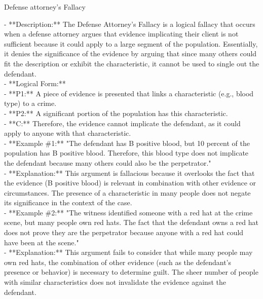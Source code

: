 \documentclass[a4paper,12pt,single,pdftex]{scrartcl}
\begin{document}
Defense attorney's Fallacy
    
      - **Description:** The Defense Attorney's Fallacy is a logical fallacy that occurs when a defense attorney argues that evidence implicating their client is not sufficient because it could apply to a large segment of the population. Essentially, it denies the significance of the evidence by arguing that since many others could fit the description or exhibit the characteristic, it cannot be used to single out the defendant.
    \\

    
      - **Logical Form:**
    \\

    
        - **P1:** A piece of evidence is presented that links a characteristic (e.g., blood type) to a crime.
    \\

    
        - **P2:** A significant portion of the population has this characteristic.
    \\

    
        - **C:** Therefore, the evidence cannot implicate the defendant, as it could apply to anyone with that characteristic.
    \\

    
      - **Example \#1:** "The defendant has B positive blood, but 10 percent of the population has B positive blood. Therefore, this blood type does not implicate the defendant because many others could also be the perpetrator."
    \\

    
      - **Explanation:** This argument is fallacious because it overlooks the fact that the evidence (B positive blood) is relevant in combination with other evidence or circumstances. The presence of a characteristic in many people does not negate its significance in the context of the case.
    \\

    
      - **Example \#2:** "The witness identified someone with a red hat at the crime scene, but many people own red hats. The fact that the defendant owns a red hat does not prove they are the perpetrator because anyone with a red hat could have been at the scene."
    \\

    
      - **Explanation:** This argument fails to consider that while many people may own red hats, the combination of other evidence (such as the defendant's presence or behavior) is necessary to determine guilt. The sheer number of people with similar characteristics does not invalidate the evidence against the defendant.
    \\
\end{document}
